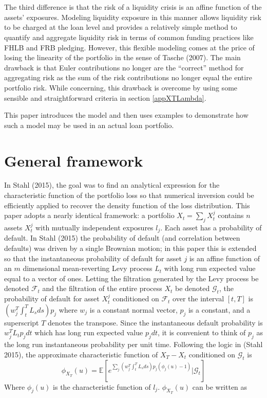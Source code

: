 \documentclass[12pt]{article}
\theoremstyle{definition}
\begin{document}
\\
\\
The third difference is that the risk of a liquidity crisis is an affine function of the assets' exposures.  Modeling liquidity exposure in this manner allows liquidity risk to be charged at the loan level and provides a relatively simple method to quantify and aggregate liquidity risk in terms of common funding practices like FHLB and FRB pledging.  However, this flexible modeling comes at the price of losing the linearity of the portfolio in the sense of Tasche (2007).  The main drawback is that Euler contributions no longer are the ``correct'' method for aggregating risk as the sum of the risk contributions no longer equal the entire portfolio risk.  While concerning, this drawback is overcome by using some sensible and straightforward criteria in section \ref{appXTLambda}.

This paper introduces the model and then uses examples to demonstrate how such a model may be used in an actual loan portfolio.  
\section{General framework}
In Stahl (2015), the goal was to find an analytical expression for the characteristic function of the portfolio loss so that numerical inversion could be efficiently applied to recover the density function of the loss distribution.  This paper adopts a nearly identical framework: a portfolio \(X_t=\sum_j X_t ^ j\) contains \(n\) assets \(X_t ^ j\) with mutually independent exposures \(l_j\).  Each asset has a probability of default.  In Stahl (2015) the probability of default (and correlation between defaults) was driven by a single Brownian motion; in this paper this is extended so that the instantaneous probability of default for asset \(j\) is an affine function of an \(m\) dimensional mean-reverting Levy process \(L_t\) with long run expected value equal to a vector of ones.  Letting the filtration generated by the Levy process be denoted \(\mathcal{F}_t\) and the filtration of the entire process \(X_t\) be denoted \(\mathcal{G}_t\), the probability of default for asset \(X_t ^ j\) conditioned on \(\mathcal{F}_t\) over the interval \([t, T]\) is \(\left(w_j ^ T \int_t ^ T L_s ds  \right) p_j\) where \(w_j\) is a constant normal vector, \(p_j\) is a constant, and a superscript \(T\) denotes the transpose.  Since the instantaneous default probability is \(w_j ^T L_t p_j dt\) which has long run expected value \(p_j dt\),  it is convenient to think of \(p_j\) as the long run instantaneous probability per unit time.  Following the logic in (Stahl 2015), the approximate characteristic function of \(X_T-X_t\) conditioned on \(\mathcal{G}_t\) is 
\begin{equation}
\phi_{X_T}(u)=\mathbb{E}\left[e^{\sum_j \left(w_j ^T \int_t ^ T L_s  ds \right) p_j (\phi_j(u)-1)} |\mathcal{G}_t\right]
\end{equation}
Where \(\phi_j(u)\) is the characteristic function of \(l_j\).  \(\phi_{X_T}(u)\) can be written as 
\end{document}
